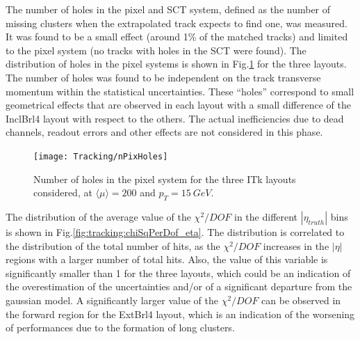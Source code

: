 \documentclass[a4paper,twoside,12pt]{book}
\begin{document}
\begin{table} [h]
\centering
	\caption{Average number of pixel, SCT and total hits in the three ITk layouts considered.}
	\label{tab:tracking:nHits}
\end{table}
 
The number of holes in the pixel and SCT system, defined as the number of missing clusters when the extrapolated track expects to find one, was measured. It was found to be
a small effect (around 1\% of the matched tracks) and limited to the pixel system (no tracks with holes in the SCT were found). The distribution of holes in the pixel systems is shown in \mbox{Fig.\ref{fig:tracking:nHoles}} for the three 
layouts. The number of holes was found to be independent on the track transverse momentum within the statistical uncertainties. 
These ``holes'' correspond to small geometrical effects that are observed in each layout with a small difference of the InclBrl4 layout with respect to the others. The actual inefficiencies due to dead channels, readout errors and other effects are not considered in this phase.\\

\begin{figure}
\centering
\texttt{[image: Tracking/nPixHoles]}
\caption{Number of holes in the pixel system for the three ITk layouts considered, at $\langle\mu\rangle = 200$ and $p_{T} = 15\ GeV$.}
\label{fig:tracking:nHoles}
\end{figure}

The distribution of the average value of the $\chi^{2}/DOF$ in the different $|\eta_{truth}|$ bins is shown in Fig.\ref{fig:tracking:chiSqPerDof_eta}. The distribution 
is correlated to the distribution of the total number of hits, as the $\chi^{2}/DOF$ increases in the $|\eta|$ regions with a larger number of total hits. Also, the value of this variable
is significantly smaller than 1 for the three layouts, which could be an indication of the overestimation of the uncertainties and/or of a significant departure from the gaussian model. A significantly larger value of the $\chi^{2}/DOF$ can be observed in the forward region for the ExtBrl4 layout, which is an indication of the worsening of performances
due to the formation of long clusters.\\
\end{document}
